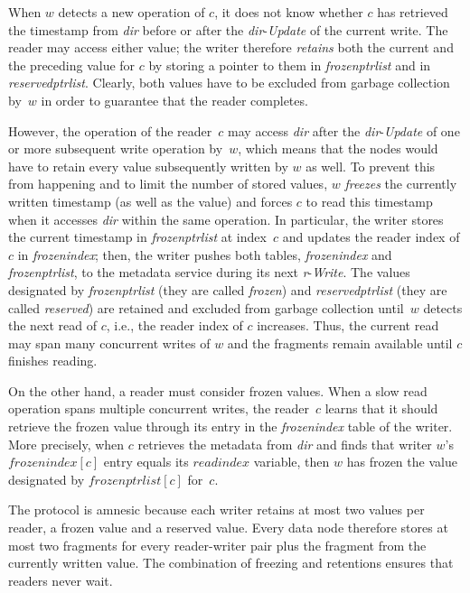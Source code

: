 \documentclass[oribibl]{llncs}
\theoremstyle{definition-boldhead}
\newcommand{\var}[1]{\textit{#1}}
\newcommand{\op}[1]{\textsl{#1}}
\newcommand{\dir}{\var{dir}\xspace}
\newcommand{\node}{node\xspace}
\newcommand{\nodes}{nodes\xspace}
\begin{document}
When $w$ detects a new operation of $c$, it does not know whether $c$ has
retrieved the timestamp from \dir before or after the \dir-\op{Update} of the
current write. The reader may access either value; the writer therefore
\emph{retains} both the current and the preceding value for
$c$ by storing a pointer to them in \var{frozenptrlist} and in
\var{reservedptrlist}.
Clearly, both values have to be excluded from garbage collection by~$w$
in order to guarantee that the reader completes.


However, the operation of the reader~$c$ may access \dir after the
\dir-\op{Update} of one or more subsequent write operation by~$w$,
which means that the \nodes would have to retain every value
subsequently written by $w$ as well.  To prevent this from happening
and to limit the number of stored values, $w$ \emph{freezes} the
currently written timestamp (as well as the value) and forces $c$ to
read this timestamp when it accesses \dir within the same operation.
In particular, the writer stores the current timestamp in
\var{frozenptrlist} at index~$c$ and updates the reader index of $c$
in \var{frozenindex}; then, the writer pushes both tables,
\var{frozenindex} and \var{frozenptrlist}, to the metadata service
during its next \var{r}-\op{Write}. The values designated by
\var{frozenptrlist} (they are called \emph{frozen}) and
\var{reservedptrlist} (they are called \emph{reserved}) are retained
and excluded from garbage collection until~$w$ detects the
next read of $c$, i.e., the reader index of $c$ increases.  Thus, the
current read may span many concurrent writes of $w$ and the fragments
remain available until $c$ finishes reading.



On the other hand, a reader must consider frozen values.  When
a slow read operation spans multiple concurrent writes, the reader~$c$
learns that it should retrieve the frozen value through its entry in
the \var{frozenindex} table of the writer.  More precisely, when $c$
retrieves the metadata from \dir and finds that writer $w$'s
$\var{frozenindex}[c]$ entry equals its $\var{readindex}$ variable,
then $w$ has frozen the value designated by $\var{frozenptrlist}[c]$
for~$c$.

The protocol is amnesic because each writer retains at most two values
per reader, a frozen value and a reserved value.  Every data \node
therefore stores at most two fragments for every reader-writer pair
plus the fragment from the currently written value.  The combination
of freezing and retentions ensures that readers never wait.
\end{document}
